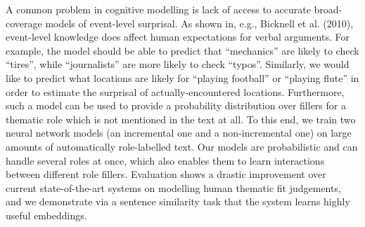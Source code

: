 A common problem in cognitive modelling is lack of access to accurate broad-coverage models of event-level surprisal. As shown in, e.g., Bicknell et al. (2010), event-level knowledge does affect human expectations for verbal arguments. For example, the model should be able to predict that ``mechanics'' are likely to check ``tires'', while ``journalists'' are more likely to check ``typos''. Similarly, we would like to predict what locations are likely for ``playing football'' or ``playing flute'' in order to estimate the surprisal of actually-encountered locations. Furthermore, such a model can be used to provide a probability distribution over fillers for a thematic role which is not mentioned in the text at all. To this end, we train two neural network models (an incremental one and a non-incremental one) on large amounts of automatically role-labelled text. Our models are probabilistic and can handle several roles at once, which also enables them to learn interactions between different role fillers. Evaluation shows a drastic improvement over current state-of-the-art systems on modelling human thematic fit judgements, and we demonstrate via a sentence similarity task that the system learns highly useful embeddings.
